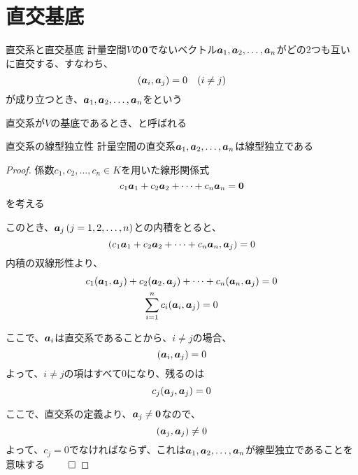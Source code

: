 \documentclass[../../../topic_linear-algebra]{subfiles}
\begin{document}
\sectionline
\section{直交基底}

\begin{definition}{直交系と直交基底}
  計量空間$V$の$\vb*{0}$でないベクトル$\vb*{a}_1, \vb*{a}_2, \ldots, \vb*{a}_n$がどの2つも互いに直交する、すなわち、
  \begin{equation*}
    (\vb*{a}_i, \vb*{a}_j) = 0 \quad (i \neq j)
  \end{equation*}
  が成り立つとき、$\vb*{a}_1, \vb*{a}_2, \ldots, \vb*{a}_n$をという

  直交系が$V$の基底であるとき、と呼ばれる
\end{definition}

\sectionline

\begin{theorem}{直交系の線型独立性}\label{thm:orthogonal-set-is-independent}
  計量空間の直交系$\vb*{a}_1, \vb*{a}_2, \ldots, \vb*{a}_n$は線型独立である
\end{theorem}

\begin{proof}
  係数$c_1, c_2, \ldots, c_n \in K$を用いた線形関係式
  \begin{equation*}
    c_1 \vb*{a}_1 + c_2 \vb*{a}_2 + \cdots + c_n \vb*{a}_n = \vb*{0}
  \end{equation*}
  を考える

  このとき、$\vb*{a}_j \, (j=1,2,\ldots,n)$との内積をとると、
  \begin{equation*}
    (c_1 \vb*{a}_1 + c_2 \vb*{a}_2 + \cdots + c_n \vb*{a}_n, \vb*{a}_j) = 0
  \end{equation*}
  内積の双線形性より、
  \begin{gather*}
    c_1 (\vb*{a}_1, \vb*{a}_j) + c_2 (\vb*{a}_2, \vb*{a}_j) + \cdots + c_n (\vb*{a}_n, \vb*{a}_j) = 0 \\
    \sum_{i=1}^n c_i (\vb*{a}_i, \vb*{a}_j) = 0
  \end{gather*}

  ここで、$\vb*{a}_i$は直交系であることから、$i \neq j$の場合、
  \begin{equation*}
    (\vb*{a}_i, \vb*{a}_j) = 0
  \end{equation*}
  よって、$i \neq j$の項はすべて0になり、残るのは
  \begin{equation*}
    c_j (\vb*{a}_j, \vb*{a}_j) = 0
  \end{equation*}

  ここで、直交系の定義より、$\vb*{a}_j \neq \vb*{0}$なので、
  \begin{equation*}
    (\vb*{a}_j, \vb*{a}_j) \neq 0
  \end{equation*}
  よって、$c_j = 0$でなければならず、これは$\vb*{a}_1, \vb*{a}_2, \ldots, \vb*{a}_n$が線型独立であることを意味する $\qed$
\end{proof}
\end{document}
